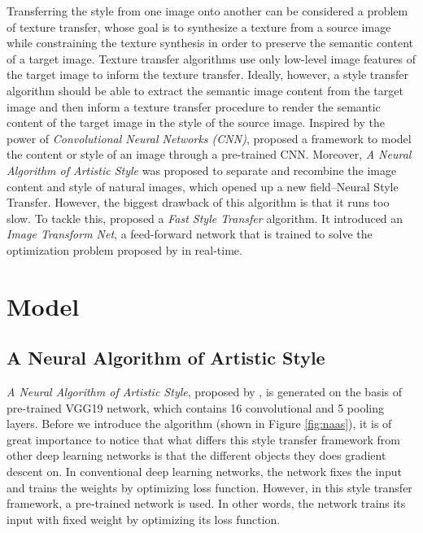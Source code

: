 \documentclass{article} %
\begin{document}
Transferring the style from one image onto another can be considered a problem of texture transfer, whose goal is to synthesize a texture from a source image while constraining the texture synthesis in order to preserve the semantic content of a target image. Texture transfer algorithms use only low-level image features of the target image to inform the texture transfer. Ideally, however, a style transfer algorithm should be able to extract the semantic image content from the target image and then inform a texture transfer procedure to render the semantic content of the target image in the style of the source image. Inspired by the power of \emph{Convolutional Neural Networks (CNN)}, \cite{1508.06576} proposed a framework to model the content or style of an image through a pre-trained CNN. Moreover, \emph{A Neural Algorithm of Artistic Style} was proposed to separate and recombine the image content and style of natural images, which opened up a new field--Neural Style Transfer. However, the biggest drawback of this algorithm is that it runs too slow. To tackle this, \cite{1603.08155} proposed a \emph{Fast Style Transfer} algorithm. It introduced an \emph{Image Transform Net}, a feed-forward network that is trained to solve the optimization problem proposed by \cite{1508.06576} in real-time.


\section{Model}
\label{model}
\subsection{A Neural Algorithm of Artistic Style}
\emph{A Neural Algorithm of Artistic Style}, proposed by \cite{1508.06576}, is generated on the basis of pre-trained VGG19 network, which contains 16 convolutional and 5 pooling layers. Before we introduce the algorithm (shown in Figure \ref{fig:naas}), it is of great importance to notice that what differs this style transfer framework from other deep learning networks is that the different objects they does gradient descent on. In conventional deep learning networks, the network fixes the input and trains the weights by optimizing loss function. However, in this style transfer framework, a pre-trained network is used. In other words, the network trains its input with fixed weight by optimizing its loss function.\\
\end{document}
